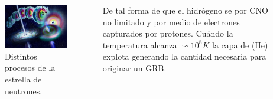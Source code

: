 \documentclass{beamer}
\begin{document}
\begin{frame}
	\begin{columns}
	
		\begin{column}{5cm}
			\begin{figure}
				\centering
				\includegraphics[scale=0.75]{neutronStar.jpg}
				\caption{Distintos procesos de la estrella de neutrones.}
			
			\end{figure}
		\end{column}
		
		\begin{column}{5cm}
		De tal forma de que el hidr\'ogeno se  por CNO no limitado y por medio de electrones 
		capturados por protones. Cu\'ando la temperatura alcanza $\backsim 10^{8}K $ la capa de (He)
		explota generando la cantidad necesaria para originar un GRB.
		\end{column}	
	\end{columns}
\end{frame}
\end{document}
